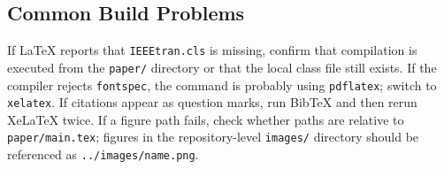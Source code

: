 \subsection{Common Build Problems}

If LaTeX reports that \texttt{IEEEtran.cls} is missing, confirm that compilation is executed from the \texttt{paper/} directory or that the local class file still exists. If the compiler rejects \texttt{fontspec}, the command is probably using \texttt{pdflatex}; switch to \texttt{xelatex}. If citations appear as question marks, run BibTeX and then rerun XeLaTeX twice. If a figure path fails, check whether paths are relative to \texttt{paper/main.tex}; figures in the repository-level \texttt{images/} directory should be referenced as \texttt{../images/name.png}.
